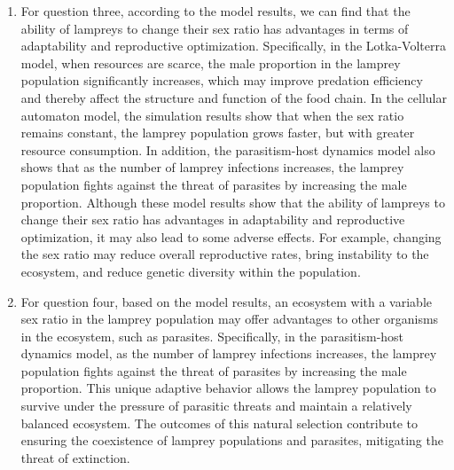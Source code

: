 \documentclass[CTeX = true]{mcmthesis}  %
\begin{document}
\begin{enumerate}
\item For question three, according to the model results, we can find that the ability of lampreys to change their sex ratio has advantages in terms of adaptability and reproductive optimization. Specifically, in the Lotka-Volterra model, when resources are scarce, the male proportion in the lamprey population significantly increases, which may improve predation efficiency and thereby affect the structure and function of the food chain. In the cellular automaton model, the simulation results show that when the sex ratio remains constant, the lamprey population grows faster, but with greater resource consumption. In addition, the parasitism-host dynamics model also shows that as the number of lamprey infections increases, the lamprey population fights against the threat of parasites by increasing the male proportion. Although these model results show that the ability of lampreys to change their sex ratio has advantages in adaptability and reproductive optimization, it may also lead to some adverse effects. For example, changing the sex ratio may reduce overall reproductive rates, bring instability to the ecosystem, and reduce genetic diversity within the population.
\item For question four, based on the model results, an ecosystem with a variable sex ratio in the lamprey population may offer advantages to other organisms in the ecosystem, such as parasites. Specifically, in the parasitism-host dynamics model, as the number of lamprey infections increases, the lamprey population fights against the threat of parasites by increasing the male proportion. This unique adaptive behavior allows the lamprey population to survive under the pressure of parasitic threats and maintain a relatively balanced ecosystem. The outcomes of this natural selection contribute to ensuring the coexistence of lamprey populations and parasites, mitigating the threat of extinction. 

\end{enumerate}
\end{document}
